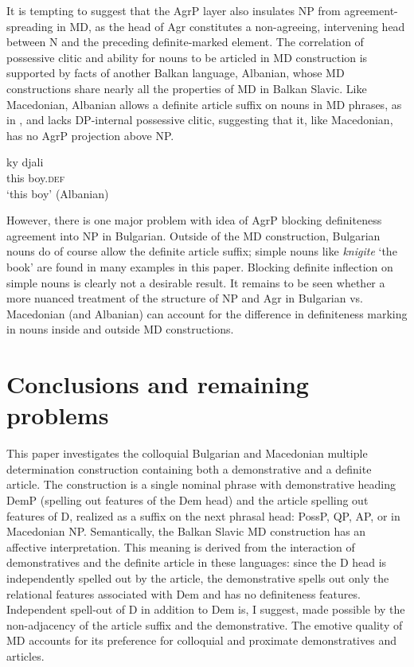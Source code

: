 \documentclass[output=paper,
colorlinks,
citecolor=brown,
newtxmath
]{langscibook}
\begin{document}
\noindent It is tempting to suggest that the AgrP layer also insulates NP from agreement-spreading in MD, as the head of Agr constitutes a non-agreeing, intervening head between N and the preceding definite-marked element. The correlation of possessive clitic and ability for nouns to be articled in MD construction is supported by facts of another Balkan language, Albanian, whose MD constructions share nearly all the properties of MD in Balkan Slavic. Like Macedonian, Albanian allows a definite article  suffix on nouns in MD phrases, as in , and lacks DP-internal possessive clitic, suggesting that it, like Macedonian, has no AgrP projection above NP.

\ea \label{albanian}
\gll ky djali \\
	this boy.\textsc{def}\\
\glt‘this boy’ \hfill (Albanian)
\z

\noindent However, there is one major problem with idea of AgrP blocking definiteness agreement into NP in Bulgarian. Outside of the MD construction, Bulgarian nouns do of course allow the definite article suffix; simple nouns like \textit{knigite} `the book' are found in many examples in this paper. Blocking definite inflection on simple nouns is clearly not a desirable result. It remains to be seen whether a more nuanced treatment of the structure of NP and Agr in Bulgarian vs. Macedonian (and Albanian) can account for the difference in definiteness marking in nouns inside and outside MD constructions.

\section{Conclusions and remaining problems}

This paper investigates the colloquial Bulgarian and Macedonian multiple determination construction containing both a demonstrative and a definite article. The construction is a single nominal phrase with demonstrative heading DemP (spelling out features of the Dem head) and the article spelling out features of D, realized as a suffix on the next phrasal head: PossP, QP, AP, or in Macedonian NP. Semantically, the Balkan Slavic MD construction has an affective interpretation. This meaning is derived from the interaction of demonstratives and the definite article in these languages: since the D head is independently spelled out by the article, the demonstrative spells out only the relational features associated with Dem and has no definiteness features. Independent spell-out of D in addition to Dem is, I suggest, made possible by the non-adjacency of the article suffix and the demonstrative. The emotive quality of MD accounts for its preference for colloquial and proximate demonstratives and articles.
\end{document}
